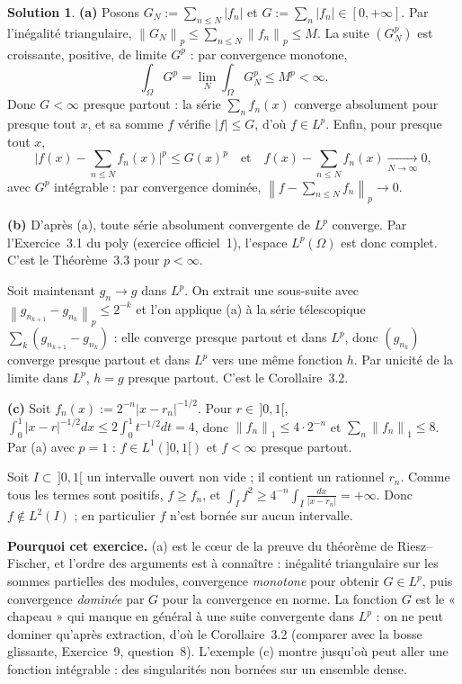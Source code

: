 \documentclass[11pt,a4paper]{article}
\newcommand{\norm}[1]{\left\|#1\right\|}
\theoremstyle{definition}
\newtheorem*{solution}{Solution}
\begin{document}
\begin{solution}
\noindent\textbf{(a)} Posons $G_N:=\sum_{n\le N}|f_n|$ et $G:=\sum_n|f_n|\in[0,+\infty]$. Par l'inégalité triangulaire, $\norm{G_N}_p\le\sum_{n\le N}\norm{f_n}_p\le M$. La suite $(G_N^p)$ est croissante, positive, de limite $G^p$ : par convergence monotone,
\[
\int_\Omega G^p=\lim_N\int_\Omega G_N^p\le M^p<\infty .
\]
Donc $G<\infty$ presque partout : la série $\sum_nf_n(x)$ converge absolument pour presque tout $x$, et sa somme $f$ vérifie $|f|\le G$, d'où $f\in L^p$. Enfin, pour presque tout $x$,
\[
\Big|f(x)-\sum_{n\le N}f_n(x)\Big|^p\le G(x)^p\quad\text{et}\quad f(x)-\sum_{n\le N}f_n(x)\xrightarrow[N\to\infty]{}0 ,
\]
avec $G^p$ intégrable : par convergence dominée, $\norm{f-\sum_{n\le N}f_n}_p\to0$.

\medskip
\noindent\textbf{(b)} D'après (a), toute série absolument convergente de $L^p$ converge. Par l'Exercice~3.1 du poly (exercice officiel~1), l'espace $L^p(\Omega)$ est donc complet. C'est le Théorème~3.3 pour $p<\infty$.

Soit maintenant $g_n\to g$ dans $L^p$. On extrait une sous-suite avec $\norm{g_{n_{k+1}}-g_{n_k}}_p\le2^{-k}$ et l'on applique (a) à la série télescopique $\sum_k(g_{n_{k+1}}-g_{n_k})$ : elle converge presque partout et dans $L^p$, donc $(g_{n_k})$ converge presque partout et dans $L^p$ vers une même fonction $h$. Par unicité de la limite dans $L^p$, $h=g$ presque partout. C'est le Corollaire~3.2.

\medskip
\noindent\textbf{(c)} Soit $f_n(x):=2^{-n}|x-r_n|^{-1/2}$. Pour $r\in\,]0,1[$, $\int_0^1|x-r|^{-1/2}dx\le2\int_0^1t^{-1/2}dt=4$, donc $\norm{f_n}_1\le4\cdot2^{-n}$ et $\sum_n\norm{f_n}_1\le8$. Par (a) avec $p=1$ : $f\in L^1(]0,1[)$ et $f<\infty$ presque partout.

Soit $I\subset\,]0,1[$ un intervalle ouvert non vide ; il contient un rationnel $r_n$. Comme tous les termes sont positifs, $f\ge f_n$, et $\int_If^2\ge4^{-n}\int_I\frac{dx}{|x-r_n|}=+\infty$. Donc $f\notin L^2(I)$ ; en particulier $f$ n'est bornée sur aucun intervalle.
\end{solution}

\begin{commentaire}
\textbf{Pourquoi cet exercice.} (a) est le cœur de la preuve du théorème de Riesz--Fischer, et l'ordre des arguments est à connaître : inégalité triangulaire sur les sommes partielles des modules, convergence \emph{monotone} pour obtenir $G\in L^p$, puis convergence \emph{dominée} par $G$ pour la convergence en norme. La fonction $G$ est le « chapeau » qui manque en général à une suite convergente dans $L^p$ : on ne peut dominer qu'après extraction, d'où le Corollaire~3.2 (comparer avec la bosse glissante, Exercice~9, question~8). L'exemple (c) montre jusqu'où peut aller une fonction intégrable : des singularités non bornées sur un ensemble dense.
\end{commentaire}
\end{document}
